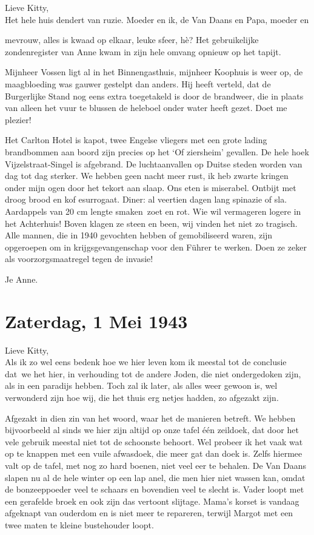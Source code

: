 \documentclass{book}
\begin{document}
Lieve Kitty,\\Het hele huis dendert van ruzie. Moeder en ik, de Van
Daans en Papa, moeder en

mevrouw, alles is kwaad op elkaar, leuke sfeer, hè? Het gebruikelijke
zondenregister van Anne kwam in zijn hele omvang opnieuw op het tapijt.

Mijnheer Vossen ligt al in het Binnengasthuis, mijnheer Koophuis is weer
op, de maagbloeding was gauwer gestelpt dan anders. Hij heeft verteld,
dat de Burgerlijke Stand nog eens extra toegetakeld is door de
brandweer, die in plaats van alleen het vuur te blussen de heleboel
onder water heeft gezet. Doet me plezier!

Het Carlton Hotel is kapot, twee Engelse vliegers met een grote lading
brandbommen aan boord zijn precies op het `Of ziersheim' gevallen. De
hele hoek Vijzelstraat-Singel is afgebrand. De luchtaanvallen op Duitse
steden worden van dag tot dag sterker. We hebben geen nacht meer rust,
ik heb zwarte kringen onder mijn ogen door het tekort aan slaap. Ons
eten is miserabel. Ontbijt met droog brood en kof esurrogaat. Diner: al
veertien dagen lang spinazie of sla. Aardappels van 20 cm lengte
smaken~zoet en rot. Wie wil vermageren logere in het Achterhuis! Boven
klagen ze steen en been, wij vinden het niet zo tragisch. Alle mannen,
die in 1940 gevochten hebben of gemobiliseerd waren, zijn opgeroepen om
in krijgsgevangenschap voor den Führer te werken. Doen ze zeker als
voorzorgsmaatregel tegen de invasie!

Je Anne.

\chapter{Zaterdag, 1 Mei 1943}

Lieve Kitty,\\Als ik zo wel eens bedenk hoe we hier leven kom ik meestal
tot de conclusie dat~we het hier, in verhouding tot de andere Joden, die
niet ondergedoken zijn, als in een paradijs hebben. Toch zal ik later,
als alles weer gewoon is, wel verwonderd zijn hoe wij, die het thuis erg
netjes hadden, zo afgezakt zijn.

Afgezakt in dien zin van het woord, waar het de manieren betreft. We
hebben bijvoorbeeld al sinds we hier zijn altijd op onze tafel één
zeildoek, dat door het vele gebruik meestal niet tot de schoonste
behoort. Wel probeer ik het vaak wat op te knappen met een vuile
afwasdoek, die meer gat dan doek is. Zelfs hiermee valt op de tafel, met
nog zo hard boenen, niet veel eer te behalen. De Van Daans slapen nu al
de hele winter op een lap anel, die men hier niet wassen kan, omdat de
bonzeeppoeder veel te schaars en bovendien veel te slecht is. Vader
loopt met een gerafelde broek en ook zijn das vertoont slijtage. Mama's
korset is vandaag afgeknapt van ouderdom en is niet meer te repareren,
terwijl Margot met een twee maten te kleine bustehouder loopt.
\end{document}
